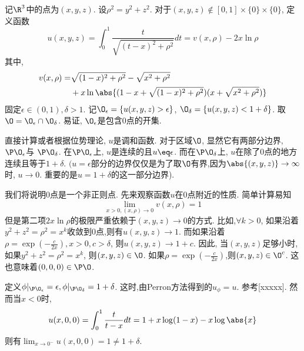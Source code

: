 \begin{example*}[非正则点]
    记$\R^3$中的点为$(x,y,z)$. 设$\rho^2=y^2+z^2$. 对于$(x,y,z) \notin [0,1]\times \{0\} \times \{0\}$, 定义函数
    \begin{equation}
        u(x,y,z)=\int^1_0 \frac{t}{\sqrt{(t-x)^2+\rho^2}}dt=v(x,\rho)-2x\ln \rho
    \end{equation}
    其中, 
    \begin{equation}
        \begin{split}
            v(x,\rho)= &\sqrt{(1-x)^2+\rho^2}-\sqrt{x^2+\rho^2} \\
            &+x\ln\abs{(1-x+\sqrt{(1-x)^2+\rho^2})(x+\sqrt{x^2+\rho^2})}
        \end{split}
    \end{equation}
    固定$\epsilon\in (0,1), \delta >1$. 记$\O_\epsilon=\{u(x,y,z) >\epsilon\}$, $\O_\delta=\{u(x,y,z) < 1+\delta\}$. 取$\O=\O_\epsilon\cap \O_\delta$. 易证, $\O_\epsilon$是包含$0$点的开集.
    \par 直接计算或者根据位势理论, $u$是调和函数. 对于区域$\O$, 显然它有两部分边界, $\P \O_\epsilon$与 $\P\O_\delta$.  在$\P \O_\epsilon$上, $u$是连续的且$u \eq \epsilon$. 而在$\P \O_\delta$上, $u$在除了$0$点的地方连续且等于$1+\delta$.
    $(u=\epsilon$部分的边界仅仅是为了取$\O$有界,因为$\abs{(x,y,z)} \to \infty$时, $u \to 0$.  重要的是$u=1+\delta$的这一部分边界).
    \par 我们将说明$0$点是一个非正则点. 先来观察函数$u$在$0$点附近的性质. 简单计算易知
    \begin{equation}
        \lim_{x>0, (x,\rho)\to 0} v(x,\rho)=1
    \end{equation}
    但是第二项$2x\ln \rho$的极限严重依赖于$(x,y,z)\to 0$的方式.  比如,$\forall k >0$, 如果沿着 $y^2+z^2=\rho^2=x^k$收敛到$0$点,则有$u(x,y,z) \to 1$.  而如果沿着$\rho=\exp(-\frac{c}{2x}), x>0, c>\delta$, 则$u(x,y,z) \to 1+c$.  因此, 当$(x,y,z)$足够小时,如果$y^2+z^2=\rho^2=x^k$, 则$(x,y,z) \in \O$.  如果$\rho=\exp(-\frac{c}{2x})$,则$(x,y,z) \in \O^c$.  这也意味着$(0,0,0) \in \P \O$.  
    \par 定义$\phi|_{\P \O_\epsilon}=\epsilon,  \phi|_{\P \O_\delta} =1+\delta$. 这时,由Perron方法得到的$u_\phi=u$. 参考[xxxxx]. 然而当$x <0$时, 
    \begin{equation}
        u(x,0,0)=\int^1_0\frac{t}{t-x}dt=1+x\log(1-x)-x\log\abs{x}
    \end{equation}
    则有$\lim_{x\to 0^-}u(x,0,0)=1 \ne 1+\delta$.
\end{example*}
